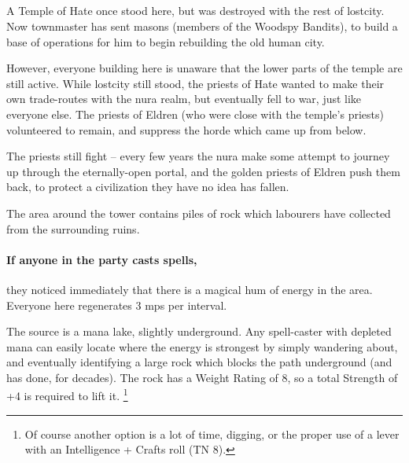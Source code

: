 \subsection{}
\label{green_tower}


A Temple of Hate once stood here, but was destroyed with the rest of \gls{lostcity}.
Now \gls{townmaster} has sent masons (members of the Woodspy Bandits), to build a base of operations for him to begin rebuilding the old human city.

However, everyone building here is unaware that the lower parts of the temple are still active.
While \gls{lostcity} still stood, the priests of Hate wanted to make their own trade-routes with the nura realm, but eventually fell to war, just like everyone else.
The priests of Eldren (who were close with the temple's priests) volunteered to remain, and suppress the horde which came up from below.

The priests still fight -- every few years the nura make some attempt to journey up through the eternally-open portal, and the golden priests of Eldren push them back, to protect a civilization they have no idea has fallen.


The area around the tower contains piles of rock which labourers have collected from the surrounding ruins.

\paragraph{If anyone in the party casts spells,}
they noticed immediately that there is a magical hum of energy in the area.
Everyone here regenerates 3 \glspl{mp} per \gls{interval}.

The source is a mana lake, slightly underground.
Any spell-caster with depleted mana can easily locate where the energy is strongest by simply wandering about, and eventually identifying a large rock which blocks the path underground (and has done, for decades).
The rock has a Weight Rating of 8, so a total Strength of +4 is required to lift it.%
\footnote{Of course another option is a lot of time, digging, or the proper use of a lever with an Intelligence + Crafts roll (TN 8).}

